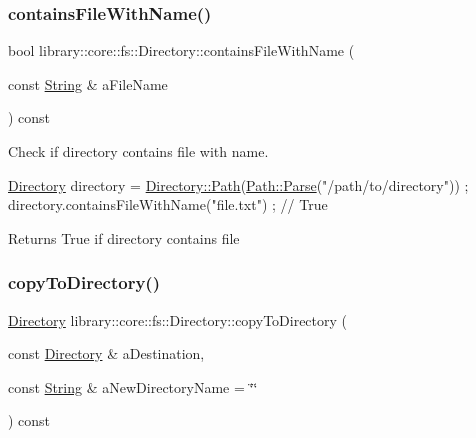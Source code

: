 \subsubsection{\texorpdfstring{contains\+File\+With\+Name()}{containsFileWithName()}}
{\footnotesize\ttfamily bool library\+::core\+::fs\+::\+Directory\+::contains\+File\+With\+Name (\begin{DoxyParamCaption}\item[{const \hyperlink{classlibrary_1_1core_1_1types_1_1_string}{String} \&}]{a\+File\+Name }\end{DoxyParamCaption}) const}



Check if directory contains file with name. 


\begin{DoxyCode}
\hyperlink{classlibrary_1_1core_1_1fs_1_1_directory_a3ec39f6cad19a81d520e9a1f2d8bb1f7}{Directory} directory = \hyperlink{classlibrary_1_1core_1_1fs_1_1_directory_ae906e33e4659219cf296dd314c7726b8}{Directory::Path}(\hyperlink{classlibrary_1_1core_1_1fs_1_1_path_a6ba644b6609507e724c217bf2020f5ae}{Path::Parse}(\textcolor{stringliteral}{"/path/to/directory"}))
       ;
directory.containsFileWithName(\textcolor{stringliteral}{"file.txt"}) ; \textcolor{comment}{// True}
\end{DoxyCode}


\begin{DoxyReturn}{Returns}
True if directory contains file 
\end{DoxyReturn}
\mbox{\label{classlibrary_1_1core_1_1fs_1_1_directory_a47e5e9a14af43a55dd45283b62baf482}} 
\subsubsection{\texorpdfstring{copy\+To\+Directory()}{copyToDirectory()}}
{\footnotesize\ttfamily \hyperlink{classlibrary_1_1core_1_1fs_1_1_directory}{Directory} library\+::core\+::fs\+::\+Directory\+::copy\+To\+Directory (\begin{DoxyParamCaption}\item[{const \hyperlink{classlibrary_1_1core_1_1fs_1_1_directory}{Directory} \&}]{a\+Destination,  }\item[{const \hyperlink{classlibrary_1_1core_1_1types_1_1_string}{String} \&}]{a\+New\+Directory\+Name = {\ttfamily \char`\"{}\char`\"{}} }\end{DoxyParamCaption}) const}



